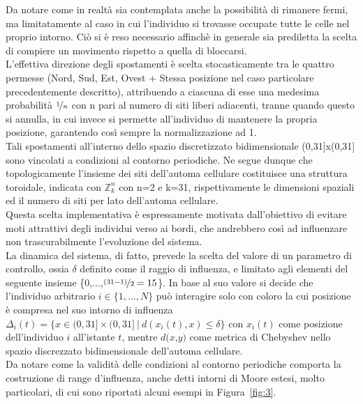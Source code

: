 \documentclass{article}
\newcommand{\Zn}{$\mathbb{Z}^n_k$ } %
\begin{document}
Da notare come in realtà sia contemplata anche la possibilità di rimanere fermi, ma limitatamente al caso in cui l'individuo si trovasse occupate tutte le celle nel proprio intorno. Ciò si è reso necessario affinchè in generale sia prediletta la scelta di compiere un movimento rispetto a quella di bloccarsi.
\\ L'effettiva direzione degli spostamenti è scelta stocasticamente tra le quattro permesse (Nord, Sud, Est, Ovest + Stessa posizione nel caso particolare precedentemente descritto), attribuendo a ciascuna di esse una medesima probabilità $\nicefrac{1}{n}$ con n pari al numero di siti liberi adiacenti, tranne quando questo si annulla, in cui invece si permette all’individuo di mantenere la propria posizione, garantendo così sempre la normalizzazione ad 1.
\\ Tali spostamenti all’interno dello spazio discretizzato bidimensionale (0,31]x(0,31] sono vincolati a condizioni al contorno periodiche. Ne segue dunque che topologicamente l’insieme dei siti dell’automa cellulare costituisce una struttura toroidale, indicata con \Zn con n=2 e k=31, rispettivamente le dimensioni spaziali ed il numero di siti per lato dell'automa cellulare.
\\ Questa scelta implementativa è espressamente motivata dall’obiettivo di evitare moti attrattivi degli individui verso ai bordi, che andrebbero così ad influenzare non trascurabilmente l’evoluzione del sistema.
\\ La dinamica del sistema, di fatto, prevede la scelta del valore di un parametro di controllo, ossia $\delta$ definito come il raggio di influenza, e limitato agli elementi del seguente insieme \{0,...,$\nicefrac{(31-1)}{2}=15$\}. In base al suo valore si decide che l'individuo arbitrario $\textit{i} \in \{1,...,\textit{N} \}$ può interagire solo con coloro la cui posizione è compresa nel suo intorno di influenza $\Delta_{i}(t) = \{ x \in (0,31] \times (0,31] \ | \ d(x_{i}(t),x)\leqslant \delta \}$ con $\textit{$x_{i}$}(t)$ come posizione dell'individuo $\textit{i}$ all'istante $\textit{t}$, mentre $\textit{d(x,y)}$ come metrica di Chebyshev nello spazio discrezzato bidimensionale dell'automa cellulare. 
\bigskip \bigskip \bigskip
\\ Da notare come la validità delle condizioni al contorno periodiche comporta la costruzione di range d'influenza, anche detti intorni di Moore estesi, molto particolari, di cui sono riportati alcuni esempi in Figura~\ref{fig:3}.
\end{document}
